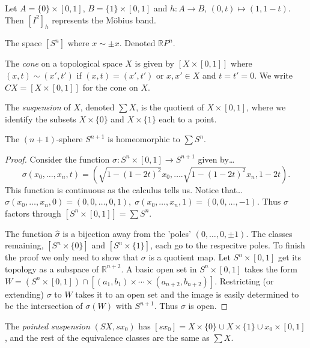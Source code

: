 \label{mobiusstrip}
Let $A = \{ 0 \} \times [0,1]$, $B = \{ 1 \} \times [0,1]$ and $h : A \rightarrow B$, $(0,t) \mapsto (1,1-t)$. Then $[I^2]_h$ represents the M\"obius band.

\label{projectivespace}
The space $[S^n]$ where $x \sim \pm x$. Denoted $\mathbb{R}P^n$.

\label{cone}
The \emph{cone} on a topological space $X$ is given by $[X \times [0,1]]$ where $(x,t) \sim (x',t')$ if $(x,t) = (x',t')$ or
$x,x' \in X$ and $t = t' = 0$. We write $CX = [X \times [0,1]]$ for the cone on $X$.

\label{suspension}
The \emph{suspension} of $X$, denoted $\sum X$, is the quotient of $X \times [0,1]$, where we identify the subsets $X \times \{ 0 \}$ and $X \times \{ 1 \}$
each to a point.

\begin{proposition}
The $(n+1)$-sphere $S^{n+1}$ is homeomorphic to $\sum S^n$.
\end{proposition}

\begin{proof}
Consider the function $\sigma : S^n \times [0,1] \rightarrow S^{n+1}$ given by\dots
$$\sigma(x_0, \dots, x_n,t) = (\sqrt{1 - (1-2t)^2}x_0, \dots. \sqrt{1 - (1 -2t)^2}x_n, 1 -2t).$$
This function is continuous as the calculus tells us. Notice that\dots
$\sigma(x_0, \dots, x_n, 0) = (0,0,\dots,0,1), \; \sigma(x_0, \dots, x_n, 1) = (0,0,\dots, -1).$
Thus $\sigma$ factors through $[S^n \times [0,1]] = \sum S^n$.
\begin{figure}[H]
\centering

\end{figure}
The function $\hat{\sigma}$ is a bijection away from the 'poles' $(0,\dots,0,\pm 1)$. The classes remaining, $[S^n \times \{ 0 \}]$ and
$[S^n \times \{ 1 \}]$, each go to the respecitve poles. To finish the proof we only need to show that $\sigma$ is a quotient map. Let
$S^n \times [0,1]$ get its topology as a subspace of $\mathbb{R}^{n+2}$. A basic open set in $S^n \times [0,1]$ takes the form
$W = (S^n \times [0,1]) \cap [(a_1, b_1) \times \cdots \times (a_{n+2}, b_{n+2})]$. Restricting (or extending) $\sigma$ to $W$ takes it
to an open set and the image is easily determined to be the intersection of $\sigma(W)$ with $S^{n+1}$. Thus $\sigma$ is open.
\end{proof}

\label{pointedsuspension}
The \emph{pointed suspension} $(SX, sx_0)$ has $[sx_0] = X \times \{ 0 \} \cup X \times \{ 1 \} \cup x_0 \times [0,1]$,
and the rest of the equivalence classes are the same as $\sum X$.

